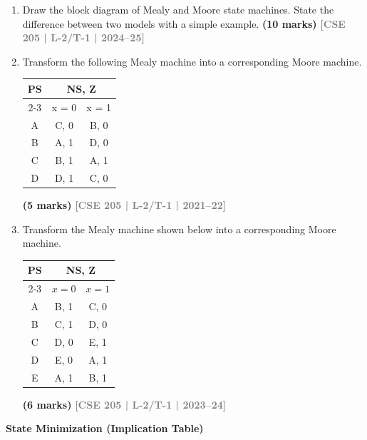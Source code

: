 \documentclass[12pt,a4paper]{article}
\newcommand{\yr}[1]{\hfill\textcolor{gray}{\small\textbf{[#1]}}}
\newcommand{\mk}[1]{\textcolor{orange!70!black}{\small\textbf{(#1 marks)}}}
\newcommand{\subtopic}[2]{%
  \vspace{10pt}
  \noindent\begin{tcolorbox}[colback=#1!8,colframe=#1,boxrule=0.6pt,arc=4pt,
    left=6pt,right=6pt,top=4pt,bottom=4pt]
    \small\bfseries\textcolor{#1}{#2}
  \end{tcolorbox}
  \vspace{2pt}
}
\begin{document}
\begin{enumerate}
\item Draw the block diagram of Mealy and Moore state machines. State the difference between two models with a simple example.
\mk{10} \yr{CSE 205 | L-2/T-1 | 2024--25}

\item Transform the following Mealy machine into a corresponding Moore machine.

\begin{center}
  \begin{tabular}{|c|c|c|}
\hline
\multirow{2}{*}{PS} & \multicolumn{2}{c|}{NS, Z} \\ \cline{2-3} 
                    & x = 0        & x = 1        \\ \hline
A                   & C, 0         & B, 0         \\ \hline
B                   & A, 1         & D, 0         \\ \hline
C                   & B, 1         & A, 1         \\ \hline
D                   & D, 1         & C, 0         \\ \hline
\end{tabular}
\end{center}

\mk{5} \yr{CSE 205 | L-2/T-1 | 2021--22}

\item Transform the Mealy machine shown below into a corresponding Moore machine.

\begin{center}
\begin{tabular}{|c|c|c|}
\hline
\multirow{2}{*}{PS} & \multicolumn{2}{c|}{NS, Z} \\ \cline{2-3}
 & $x=0$ & $x=1$ \\ \hline
A & B, 1 & C, 0 \\ \hline
B & C, 1 & D, 0 \\ \hline
C & D, 0 & E, 1 \\ \hline
D & E, 0 & A, 1 \\ \hline
E & A, 1 & B, 1 \\ \hline
\end{tabular}
\end{center}

\mk{6} \yr{CSE 205 | L-2/T-1 | 2023--24}

\end{enumerate}
\subtopic{cF}{State Minimization (Implication Table)}
\end{document}
